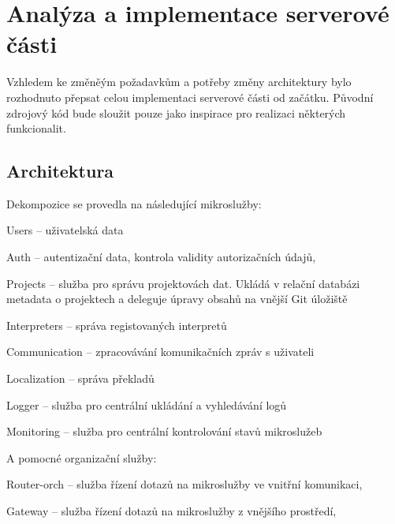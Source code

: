 \chapter{Analýza a implementace serverové části}\label{ch:server}


Vzhledem ke změněým požadavkům a potřeby změny architektury bylo rozhodnuto přepsat celou implementaci serverové části od začátku.
Původní zdrojový kód bude sloužit pouze jako inspirace pro realizaci některých funkcionalit.


\section{Architektura}\label{sec:server-arch}


Dekompozice se provedla na následující mikroslužby:



\begin{dl}
   \item[Users] – uživatelská data
   \item[Auth] – autentizační data, kontrola validity autorizačních údajů,
   \item[Projects] – služba pro správu projektovách dat.
   Ukládá v relační databázi metadata o projektech a deleguje úpravy obsahů na vnější Git úložiště
   \item[Interpreters] – správa registovaných interpretů
   \item[Communication] – zpracovávání komunikačních zpráv s uživateli
   \item[Localization] – správa překladů
   \item[Logger] – služba pro centrální ukládání a vyhledávání logů
   \item[Monitoring] – služba pro centrální kontrolování stavů mikroslužeb
\end{dl}

A pomocné organizační služby:

\begin{dl}
   \item[Router-orch] – služba řízení dotazů na mikroslužby ve vnitřní komunikaci,
   \item[Gateway] – služba řízení dotazů na mikroslužby z vnějšího prostředí,
\end{dl}

